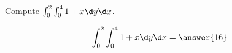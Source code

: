\documentclass{ximera}
\author{David Guichard \and Neal Koblitz \and H. Jerome Keisler \and Albert Scheller \and Barry Balof \and Mike Wills \and Matthew Carr}
\begin{document}
\begin{exercise}




Compute $\int_{0}^{2}\int_{0}^{4}1+x\d y\d x$.
\begin{prompt}
\[
\int_{0}^{2}\int_{0}^{4}1+x\d y\d x=\answer{16}
\]
\end{prompt}



\end{exercise}
\end{document}
